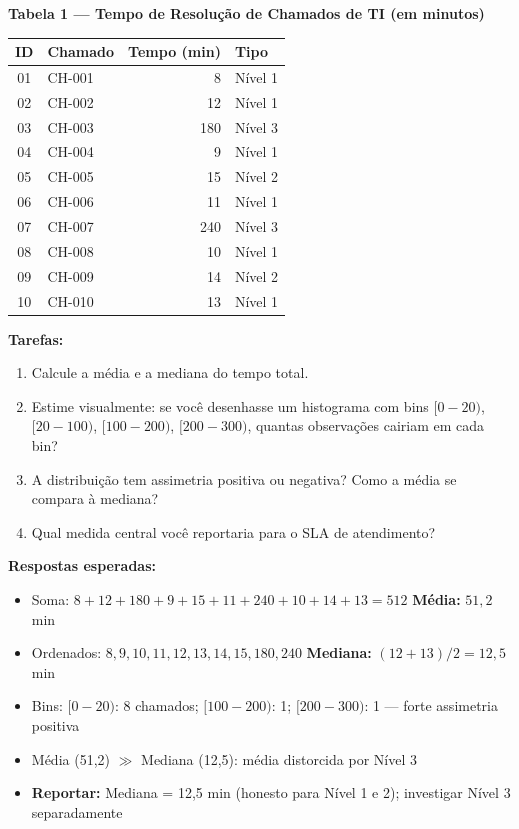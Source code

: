 \begin{BoardBox}
\textbf{Tabela 1 — Tempo de Resolução de Chamados de TI (em minutos)}

\medskip
\begin{tabular}{|c|l|r|l|}
\hline
\textbf{ID} & \textbf{Chamado} & \textbf{Tempo (min)} & \textbf{Tipo} \\
\hline
01 & CH-001 & 8   & Nível 1 \\
02 & CH-002 & 12  & Nível 1 \\
03 & CH-003 & 180 & Nível 3 \\
04 & CH-004 & 9   & Nível 1 \\
05 & CH-005 & 15  & Nível 2 \\
06 & CH-006 & 11  & Nível 1 \\
07 & CH-007 & 240 & Nível 3 \\
08 & CH-008 & 10  & Nível 1 \\
09 & CH-009 & 14  & Nível 2 \\
10 & CH-010 & 13  & Nível 1 \\
\hline
\end{tabular}

\medskip
\textbf{Tarefas:}
\begin{enumerate}
  \item Calcule a média e a mediana do tempo total.
  \item Estime visualmente: se você desenhasse um histograma com bins
  $[0{-}20)$, $[20{-}100)$, $[100{-}200)$, $[200{-}300)$, quantas observações
  cairiam em cada bin?
  \item A distribuição tem assimetria positiva ou negativa? Como a média
  se compara à mediana?
  \item Qual medida central você reportaria para o SLA de atendimento?
\end{enumerate}

\textbf{Respostas esperadas:}
\begin{itemize}
  \item Soma: $8+12+180+9+15+11+240+10+14+13 = 512$ \quad \textbf{Média:} $51{,}2$ min
  \item Ordenados: $8,9,10,11,12,13,14,15,180,240$ \quad \textbf{Mediana:} $(12+13)/2 = 12{,}5$ min
  \item Bins: $[0{-}20)$: 8 chamados; $[100{-}200)$: 1; $[200{-}300)$: 1 — forte assimetria positiva
  \item Média (51,2) $\gg$ Mediana (12,5): média distorcida por Nível 3
  \item \textbf{Reportar:} Mediana = 12,5 min (honesto para Nível 1 e 2); investigar Nível 3 separadamente
\end{itemize}
\end{BoardBox}

